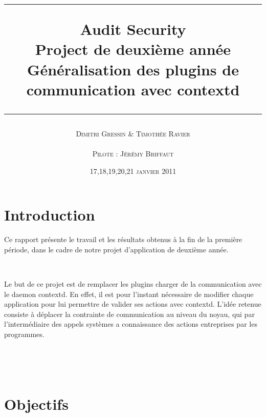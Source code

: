 \documentclass[pdftex,a4paper,titlepage,11pt,openright]{article}
\newcommand{\nom}[1]{\textsc{#1}}
\newcommand{\ligne}[1][1pt]{
  \par\noindent
  \rule[.5ex]{\linewidth}{#1}\par}
\newcommand{\clearemptydoublepage}{
	\newpage{\pagestyle{empty}\cleardoublepage}}
\begin{document}
\setlength{\parskip}{2.4ex}

\title{
\ligne{\Large}
\textbf{Audit Security}\\
\textbf{Project de deuxième année}\\
\Large Généralisation des plugins de communication avec contextd
\ligne{\Large}
}
\author{\nom{Dimitri Gressin} \& \nom{Timothée Ravier}\\\\\nom{Pilote : Jérémy Briffaut}}
\date{17,18,19,20,21 \textsc{janvier} 2011} %

\maketitle

\clearemptydoublepage

\setcounter{secnumdepth}{2}
\setcounter{tocdepth}{2}
\tableofcontents
\addtocounter{page}{-1}

\newpage

\section*{Introduction} 
Ce rapport présente le travail et les résultats obtenus à la fin de la première période, dans le cadre de notre projet d'application de deuxième année.

~

Le but de ce projet est de remplacer les plugins charger de la communication avec le daemon contextd. En effet, il est pour l'instant nécessaire de modifier chaque application pour lui permettre de valider ses actions avec contextd. L'idée retenue consiste à déplacer la contrainte de communication au niveau du noyau, qui par l'intermédiaire des appels systèmes a connaissance des actions entreprises par les programmes.

~


~


\newpage

\section{Objectifs}
\end{document}
